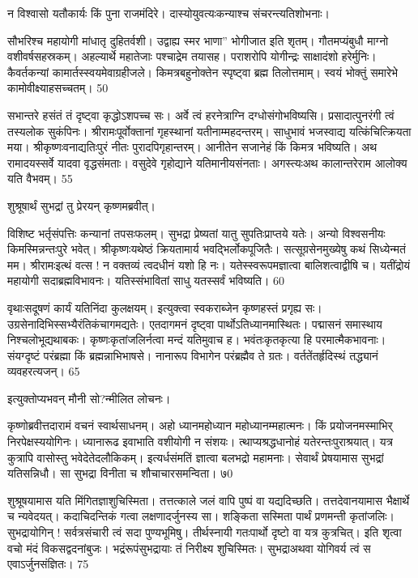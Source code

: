   न विश्वासो यतौकार्यः किं पुना राजमंदिरे।
 दास्योयुवत्यःकन्याश्च संचरन्त्यतिशोभनाः।
 
सौभरिश्च महायोगी मांधातृ दुहितर्वशी।
 उद्वाह्य स्मर भाणा” भोगीजात इति शृतम्।
 गौतमप्यंबुधौ माग्नो वशीवर्षसहस्रकम्।
 अहल्यार्थे महातेजाः पश्चाद्रेम तयासह।
 पराशरोपि योगीन्द्रः साक्षादंशो हरेर्मुनिः।
 कैवर्तकन्यां कामार्तस्स्वयमेवाग्रहीजले।
 किमत्रबहुनोक्तेन स्पृष्ट्वा ब्रह्म तिलोत्तमाम्।
 स्वयं भोक्तुं समारेभे कामोवीक्ष्याहसच्चतम्।
 50

  सभान्तरे हसंतं तं दृष्ट्वा कृद्धोऽशपच्च सः।
 अर्वे त्वं हरनेत्राग्नि दग्धोसंगोभविष्यसि।
 प्रसादात्पुनरंगी त्वं तस्यलोक सुकंपिनः।
 श्रीरामःपूर्वोक्तानां गृहस्थानां यतीनाम्महदन्तरम्।
 साधुभावं भजस्वाद्य यत्किंचित्क्रियता मया।
 श्रीकृष्णःवनाद्यतिःपुरं नीतः पुरादपिगृहान्तरम्।
 आनीतेन सजानेहं किं किमत्र भविष्यति।
 अथ रामादयस्सर्वे यादवा वृद्धसंमताः।
 वसुदेवे गृहोद्याने यतिमानीयसंनताः।
 अगस्त्यःअथ कालान्तरेराम आलोक्य यति वैभवम्।
 55

  शुश्रूषार्थं सुभद्रां तु प्रेरयन् कृष्णमब्रवीत्।

विशिष्ट भर्तृसंपत्तिः कन्यानां तपसःफलम्।
 सुभद्रा प्रेष्यतां यातु सुपतिःप्राप्तये यतेः।
 अन्यो विश्वसनीयः किमस्मिन्नन्तःपुरे भवेत्।
 श्रीकृष्णःयथेष्ठं क्रियतामार्य भवद्भिर्लोकपूजितैः।
 सत्सूग्रसेनमुख्येषु कथं सिध्येन्मतं मम।
 श्रीरामःइत्थं वत्स ! न वक्तव्यं त्वदधीनं यशो हि नः।
 यतेस्स्वरूपमज्ञात्वा बालिशत्वाद्वीषि च।
 यतींद्रोयं महायोगी सदाब्रह्मविभावनः।
 यतिस्संभावितां साधु यतस्सर्वं भविष्यति।
 60

  वृथाःसदूषणं कार्यं यतिनिंदा कुलक्षयम्।
 इत्युक्त्वा स्वकराब्जेन कृष्णहस्तं प्रगृह्य सः।
 उग्रसेनादिभिस्सभ्यैरंतिकंचागमद्यतेः।
 एतदागमनं दृष्ट्वा पार्थोऽतिध्यानमास्थितः।
 पद्मासनं समास्थाय निश्चलोभूद्यथाबकः।
 कृष्णःकृतांजलिर्नत्वा मन्दं यतिमुवाच ह।
 भवंतःकृतकृत्या हि परमात्मैकभावनाः।
 संयग्दृष्टं परंब्रह्मा किं ब्रह्मन्नाभिभाषसे।
 नानारूप विभागेन परंब्रह्मैव ते ग्रतः।
 वर्ततेंतर्हृदिस्थं तद्ध्यानं व्यवहरत्यजन्।
 65

  इत्युक्तोप्यभवन् मौनी सो?न्मीलित लोचनः।

कृष्णोब्रवीत्तदारामं वचनं स्वार्थसाधनम्।
 अहो ध्यानमहोध्यान महोध्यानम्महात्मनः।
 किं प्रयोजनमस्माभिर् निरपेक्षस्ययोगिनः।
 ध्यानारूढ इवाभाति वशीयोगी न संशयः।
 त्थाप्यश्रद्धधानोहं यतेरन्तःपुराश्रयात्।
 यत्र कुत्रापि वासोस्तु भवेदेतेदलौकिकम्।
 इत्यर्धसंमतिं ज्ञात्वा बलभद्रो महामनाः।
 सेवार्थं प्रेषयामास सुभद्रां यतिसन्निधौ।
 सा सुभद्रा विनीता च शौचाचारसमन्विता।
 ७0

  शुश्रूषयामास यति मिंगितज्ञाशुचिस्मिता।
 तत्तत्काले जलं वापि पुष्पं वा यद्यदिच्छति।
 तत्तदेवानयामास भैक्षार्थे च न्यवेदयत्।
 कदाचिदन्तिकं गत्वा लक्षणादर्जुनस्य सा।
 शङ्किता सस्मिता पार्थं प्रणमन्ती कृतांजलिः।
 सुभद्रायोगिन् ! सर्वत्रसंचारी त्वं सदा पुण्यभूमिषु।
 तीर्थस्नायी गतःपार्थो दृष्टो वा यत्र कुत्रचित्।
 इति शृत्वा वचो मंदं विकसद्वदनांबुजः।
 भद्रंरूपंसुभद्रायाः तं निरीक्ष्य शुचिस्मितः।
 सुभद्राअथवा योगिवर्य त्वं स एवाऽर्जुनसंज्ञितः।
 75

